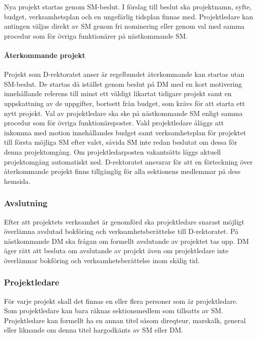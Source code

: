 \documentclass{dgovdoc}
\begin{document}
Nya projekt startas genom SM-beslut. I förslag till beslut ska projektnamn,
syfte, budget, verksamhetsplan och en ungefärlig tidsplan finnas med.
Projektledare kan antingen väljas direkt av SM genom fri nominering
eller genom val med samma procedur som för övriga funktionärer på
nästkommande SM.

\paragraph{Återkommande projekt}

Projekt som D-rektoratet anser är regelbundet återkommande kan startas
utan SM-beslut. De startas då istället genom beslut på DM med en kort
motivering innehållande referens till minst ett väldigt likartat tidigare
projekt samt en uppskattning av de uppgifter, bortsett från budget, som krävs
för att starta ett nytt projekt. Val av projektledare ska ske på nästkommande
SM enligt samma procedur som för övriga funktionärsposter. Vald projektledare åläggs att inkomma med motion innehållandes budget samt verksamhetsplan för projektet till första möjliga SM efter valet, såvida SM inte redan beslutat om dessa för denna projektomgång. Om projektledarposten vakantsätts läggs aktuell projektomgång
automatiskt ned. D-rektoratet ansvarar för att en förteckning över återkommande
projekt finns tillgänglig för alla sektionens medlemmar på dess hemsida.

\subsubsection{Avslutning}

Efter att projektets verksamhet är genomförd ska projektledare snarast möjligt
överlämna avslutad bokföring och verksamhetsberättelse till D-rektoratet.
På nästkommande DM ska frågan om formellt avslutande av projektet tas upp.
DM äger rätt att besluta om avslutande av projekt även om projektledare inte
överlämnar bokföring och verksamhetsberättelse inom skälig tid.

\subsubsection{Projektledare}

För varje projekt skall det finnas en eller flera personer som är
projektledare. Som projektledare kan bara räknas sektionsmedlem som tillsatts
av SM. Projektledare kan formellt ha en annan titel såsom direqteur, marskalk,
general eller liknande om denna titel hargodkänts av SM eller DM.
\end{document}
